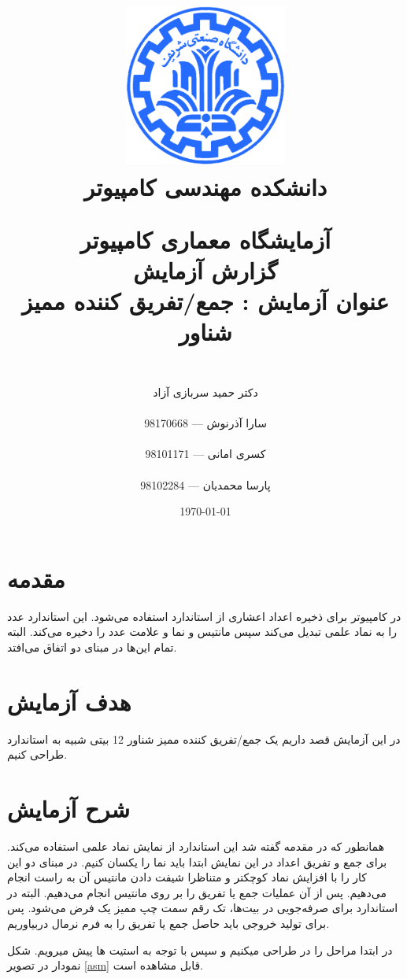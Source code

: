 \documentclass[fleqn]{article}
\title{
\includegraphics[width=0.4\textwidth]{sharif.png}\\
\normalsize{دانشکده مهندسی کامپیوتر}\\
\vspace{1cm}
    
\huge{آزمایشگاه معماری کامپیوتر}
\\ \vspace{.8cm}
\Large{گزارش آزمایش \expnumber}
\\ \vspace{.8cm}
\Large{عنوان آزمایش : جمع/تفریق کننده ممیز شناور}
}
\author{
\\
دکتر حمید سربازی آزاد
\\ \vspace{.4cm}
\\
  سارا آذرنوش       ---      98170668
\\ \vspace{0.2cm} \\
  کسری امانی       ---      98101171
\\ \vspace{0.2cm} \\
  پارسا محمدیان       ---      98102284
\\ \vspace{.4cm}
}
\date{\today}
\newcommand{\expnumber}{سوم}
\begin{document}
\clearpage\maketitle
\thispagestyle{empty}

\newpage

\pagestyle{fancy}

\rhead{آزمایش \expnumber}

\tableofcontents

\setcounter{page}{1}

\newpage

\section{مقدمه}
در کامپیوتر برای ذخیره اعداد اعشاری از استاندارد 
استفاده می‌شود. این استاندارد عدد را به نماد علمی تبدیل می‌کند سپس مانتیس و نما و علامت عدد را دخیره می‌کند. 
البته تمام این‌ها در مبنای دو اتفاق می‌افتد.

\section{هدف آزمایش}
در این آزمایش قصد داریم یک جمع/تفریق کننده ممیز شناور 12 بیتی شبیه به استاندارد 
طراحی کنیم.

\section{شرح آزمایش}
همانطور که در مقدمه گفته شد این استاندارد از نمایش نماد علمی استفاده می‌کند. برای جمع و تفریق اعداد 
در این نمایش ابتدا باید نما را یکسان کنیم. در مبنای دو این کار را با افزایش نماد کوچکتر و متناظرا شیفت دادن مانتیس 
آن به راست انجام می‌دهیم. پس از آن عملیات جمع یا تفریق را بر روی مانتیس انجام می‌دهیم. البته در استاندارد 
برای صرفه‌جویی در بیت‌ها، تک رقم سمت چپ ممیز یک فرض می‌شود. پس برای تولید خروجی باید حاصل جمع یا تفریق را 
به فرم نرمال دربیاوریم. 

در ابتدا مراحل را در 
طراحی میکنیم و سپس با توجه به استیت ها پیش میرویم. شکل نمودار 
در تصویر 
\ref{asm}
قابل مشاهده است.
\end{document}
